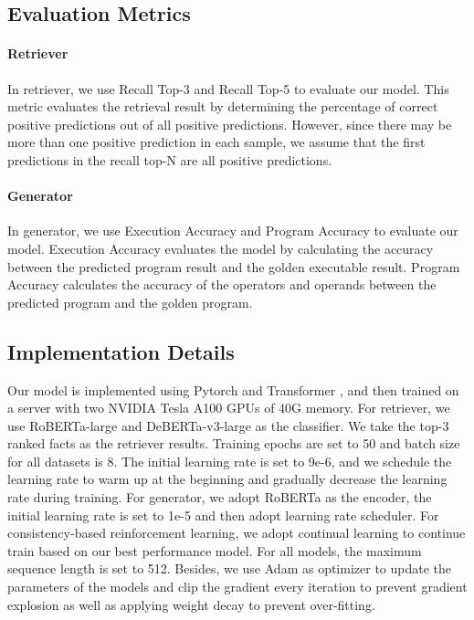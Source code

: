 \documentclass[11pt]{article}
\begin{document}
\subsection{Evaluation Metrics}
 \paragraph{Retriever}
In retriever, we use Recall Top-3 and Recall Top-5 to evaluate our model. This metric evaluates the retrieval result by determining the percentage of correct positive predictions out of all positive predictions. However, since there may be more than one positive prediction in each sample, we assume that the first  predictions in the recall top-N are all positive predictions.
\paragraph{Generator}
In generator, we use Execution Accuracy and Program Accuracy to evaluate our model. Execution Accuracy evaluates the model by calculating the accuracy between the predicted program result and the golden executable result. Program Accuracy calculates the accuracy of the operators and operands between the predicted program and the golden program.


\subsection{Implementation Details}
Our model is implemented using Pytorch \cite{paszke2019pytorch} and Transformer \cite{wolf2020transformers}, and then trained on a server with two NVIDIA Tesla A100 GPUs of 40G memory. For retriever, we use RoBERTa-large and DeBERTa-v3-large as the classifier. We take the top-3 ranked facts as the retriever results. Training epochs are set to 50 and batch size for all datasets is 8. The initial learning rate is set to 9e-6, and we schedule the learning rate to warm up at the beginning and gradually decrease the learning rate during training. For generator, we adopt RoBERTa as the encoder, the initial learning rate is set to 1e-5 and then adopt learning rate scheduler. For consistency-based reinforcement learning, we adopt continual learning to continue train based on our best performance model. For all models, the maximum sequence length is set to 512. Besides, we use Adam as optimizer \cite{kingma2014adam} to update the parameters of the models and clip the gradient every iteration to prevent gradient explosion as well as applying weight decay to prevent over-fitting. 
\end{document}
